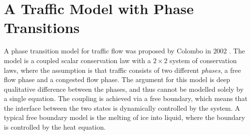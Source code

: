 \documentclass[10pt]{article}
\numberwithin{equation}{section}
\begin{document}
\newpage
\section{A Traffic Model with Phase Transitions}
A phase transition model for traffic flow was proposed by Colombo in $2002$ \cite{Colombo2003}. The model is a coupled scalar conservation law with a $2 \times 2$ system of conservation laws, where the assumption is that traffic consists of two different \textit{phases}, a free flow phase and a congested flow phase. The argument for this model is deep qualitative difference between the phases, and thus cannot be modelled solely by a single equation. The coupling is achieved via a free boundary, which means that the interface between the two states is dynamically controlled by the system. A typical free boundary model is the melting of ice into liquid, where the boundary is controlled by the heat equation. 
\end{document}
